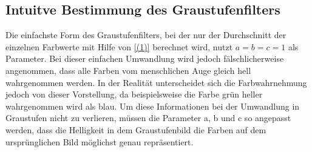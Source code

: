 \documentclass[course=erap]{aspdoc}
\begin{document}
	\subsection{Intuitve Bestimmung des Graustufenfilters}
	Die einfachste Form des Graustufenfilters, bei der nur der Durchschnitt der einzelnen Farbwerte mit Hilfe von \eqref{(1)} berechnet wird, nutzt $a=b=c=1$ als Parameter. Bei dieser einfachen Umwandlung wird jedoch fälschlicherweise angenommen, dass alle Farben vom menschlichen Auge gleich hell wahrgenommen werden. In der Realität unterscheidet sich die Farbwahrnehmung jedoch von dieser Vorstellung, da beispielsweise die Farbe grün heller wahrgenommen wird als blau. Um diese Informationen bei der Umwandlung in Graustufen nicht zu verlieren, müssen die Parameter a, b und c so angepasst werden, dass die Helligkeit in dem Graustufenbild die Farben auf dem ursprünglichen Bild möglichst genau repräsentiert.
\end{document}
